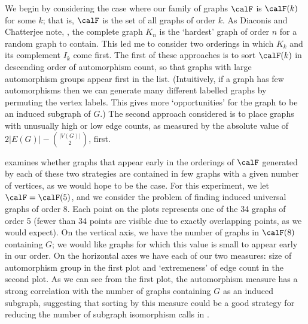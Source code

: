 We begin by considering the case where our family of graphs $\calF$
is $\calF(k)$ for some $k$; that is,
$\calF$ is the set of all graphs of order $k$.
As Diaconis and Chatterjee note, \cite{chatterjee2021isomorphisms}, the complete
graph $K_n$ is the `hardest' graph of order $n$ for a random graph to contain.
This led me
to consider two orderings in which $K_k$ and its complement $I_k$ come
first.  The first of these approaches is to sort $\calF(k)$ in descending
order of automorphism count, so that
graphs with large automorphism groups appear first in the list.  (Intuitively, if a graph
has few automorphisms then we can generate many different labelled graphs
by permuting the vertex labels.  This gives more `opportunities' for the
graph to be an induced subgraph of $G$.)
The second approach considered is to place graphs
with unusually high or low edge counts, as measured by the absolute value of
${2|E(G)| - {|V(G)| \choose 2}}$, first.

 examines whether graphs that appear early in the orderings
of $\calF$
generated by each of these two strategies are contained in few graphs with
a given number of vertices, as we would hope to be the case.
For this experiment, we let $\calF = \calF(5)$, and we consider the problem
of finding induced universal graphs of order 8.
Each point on the plots
represents one of the 34 graphs of order 5 (fewer than 34 points are visible
due to exactly overlapping points, as we would expect).  On the vertical
axis, we have the number of graphs in $\calF(8)$ containing $G$; we would like
graphs for which this value is small to appear early in our order.
On the horizontal axes we have each of our two measures: size of automorphism group
in the first plot and `extremeness' of edge count in the second plot.
As we can see from the first plot, the automorphism measure has a strong correlation
with the number of graphs containing $G$ as an induced subgraph, suggesting that
sorting by this measure could be a good strategy for reducing the number of
subgraph isomorphism calls in .

